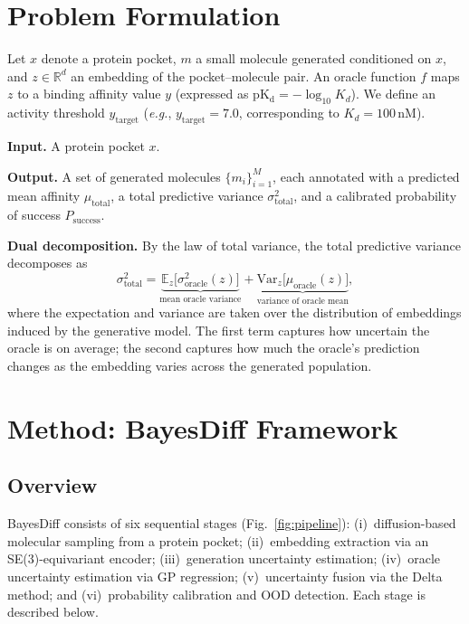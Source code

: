 \documentclass{article}
\newcommand{\Psuccess}{P_{\mathrm{success}}}
\newcommand{\Uoracle}{\sigma^{2}_{\mathrm{oracle}}}
\newcommand{\Utotal}{\sigma^{2}_{\mathrm{total}}}
\newcommand{\muoracle}{\mu_{\mathrm{oracle}}}
\newcommand{\ytarget}{y_{\mathrm{target}}}
\newcommand{\pKd}{\mathrm{pK_d}}
\newcommand{\Rreal}{\mathbb{R}}
\newcommand{\Ex}{\mathbb{E}}
\newcommand{\Var}{\mathrm{Var}}
\newcommand{\eg}{\textit{e.g.}}
\begin{document}
\section{Problem Formulation}

Let $x$ denote a protein pocket, $m$ a small molecule generated
conditioned on $x$, and $z \in \Rreal^{d}$ an embedding of the
pocket--molecule pair.  An oracle function $f$ maps $z$ to a binding
affinity value $y$ (expressed as $\pKd = -\log_{10} K_d$).  We define an
activity threshold $\ytarget$ (\eg, $\ytarget = 7.0$, corresponding to
$K_d = 100\,\mathrm{nM}$).

\textbf{Input.}  A protein pocket $x$.

\textbf{Output.}  A set of generated molecules $\{m_i\}_{i=1}^{M}$,
each annotated with a predicted mean affinity $\mu_{\mathrm{total}}$,
a total predictive variance $\Utotal$, and a calibrated probability of
success $\Psuccess$.

\textbf{Dual decomposition.}  By the law of total variance, the total
predictive variance decomposes as
\begin{equation}
  \Utotal
  = \underbrace{\Ex_{z}\!\bigl[\Uoracle(z)\bigr]}_{\text{mean oracle variance}}
  + \underbrace{\Var_{z}\!\bigl[\muoracle(z)\bigr]}_{\text{variance of oracle mean}},
  \label{eq:lotv}
\end{equation}
where the expectation and variance are taken over the distribution of
embeddings induced by the generative model.  The first term captures how
uncertain the oracle is on average; the second captures how much the
oracle's prediction changes as the embedding varies across the generated
population.


\section{Method: BayesDiff Framework}

\subsection{Overview}

BayesDiff consists of six sequential stages (Fig.~\ref{fig:pipeline}):
(i)~diffusion-based molecular sampling from a protein pocket;
(ii)~embedding extraction via an SE(3)-equivariant encoder;
(iii)~generation uncertainty estimation;
(iv)~oracle uncertainty estimation via GP regression;
(v)~uncertainty fusion via the Delta method; and
(vi)~probability calibration and OOD detection.
Each stage is described below.
\end{document}
